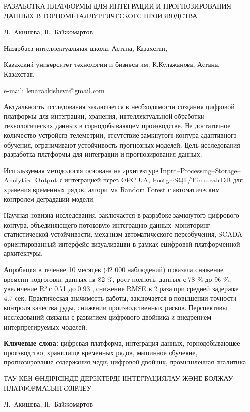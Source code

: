 \begin{header}
РАЗРАБОТКА ПЛАТФОРМЫ ДЛЯ ИНТЕГРАЦИИ И ПРОГНОЗИРОВАНИЯ ДАННЫХ В ГОРНОМЕТАЛЛУРГИЧЕСКОГО ПРОИЗВОДСТВА

Л.~Акишева\envelope,
Н.~Байжомартов
\end{header}

\begin{affil}
Назарбаев интеллектуальная школа, Астана, Казахстан,

Казахский университет технологии и бизнеса им. К.Кулажанова, Астана, Казахстан,

e-mail: lenaraakisheva@gmail.com
\end{affil}

Актуальность исследования заключается в необходимости создания цифровой
платформы для интеграции, хранения, интеллектуальной обработки
технологических данных в горнодобывающем производстве. Не достаточное
количество устройств телеметрии, отсутствие замкнутого контура
адаптивного обучения, ограничивают устойчивость прогнозных моделей. Цель
исследования разработка платформы для интеграции и прогнозирования
данных.

Используемая методология основана на архитектуре
Input--Processing--Storage--Analytics--Output с интеграцией через OPC
UA, PostgreSQL/TimescaleDB для хранения временных рядов, алгоритма
Random Forest с автоматическим контролем деградации модели.

Научная новизна исследования, заключается в разрабоке замкнутого
цифрового контура, объединяющего потоковую интеграцию данных, мониторинг
статистической устойчивости, механизм автоматического переобучения,
SCADA-ориентированный интерфейс визуализации в рамках ецифровой
платформенной архитектуры.

Апробация в течение 10 месяцев (42 000 наблюдений) показала снижение
времени подготовки данных на 82 \%, рост полноты данных с 78 \% до 96
\%, увеличение R² с 0.71 до 0.93 , снижение RMSE в 2 раза при средней
задержке 4.7 сек. Практическая значимость работы, заключается в
повышении точности контроля качества руды, снижении производственных
рисков. Перспективы исследований связаны с развитием цифрового двойника
и внедрением интерпретируемых моделей.

{\bfseries Ключевые слова:} цифровая платформа, интеграция данных, горнодобывающее
производство, хранилище временных рядов, машинное обучение,
прогнозирование содержания меди, цифровой двойник, промышленная
аналитика

\begin{header}
ТАУ-КЕН ӨНДІРІСІНДЕ ДЕРЕКТЕРДІ ИНТЕГРАЦИЯЛАУ ЖӘНЕ БОЛЖАУ ПЛАТФОРМАСЫН ӘЗІРЛЕУ

Л.~Акишева\envelope,
Н.~Байжомартов
\end{header}

